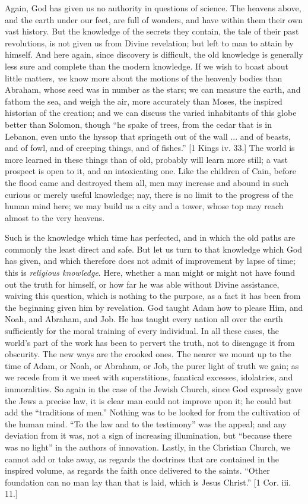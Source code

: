 Again, God has given us no authority in questions of science. The
heavens above, and the earth under our feet, are full of wonders, and
have within them their own vast history. But the knowledge of the
secrets they contain, the tale of their past revolutions, is not given
us from Divine revelation; but left to man to attain by himself. And
here again, since discovery is difficult, the old knowledge is
generally less sure and complete than the modern knowledge. If we wish
to boast about little matters, \emph{we} know more about the motions
of the heavenly bodies than Abraham, whose seed was in number as the
stars; we can measure the earth, and fathom the sea, and weigh the
air, more accurately than Moses, the inspired historian of the
creation; and we can discuss the varied inhabitants of this globe
better than Solomon, though ``he spake of trees, from the cedar
that is in Lebanon, even unto the hyssop that springeth out of the
wall ... and of beasts, and of fowl, and of creeping things, and of
fishes.'' [1 Kings iv. 33.] The world is more learned in these
things than of old, probably will learn more still; a vast prospect is
open to it, and an intoxicating one. Like the children of Cain, before
the flood came and destroyed them all, men may increase and abound in
such curious or merely useful knowledge; nay, there is no limit to the
progress of the human mind here; we may build us a city and a tower,
whose top may reach almost to the very heavens.

Such is the knowledge which time has perfected, and in which the
old paths are commonly the least direct and safe. But let us turn to
that knowledge which God has given, and which therefore does not admit
of improvement by lapse of time; this is \emph{religious knowledge}.
Here, whether a man might or might not have found out the truth for
himself, or how far he was able without Divine assistance, waiving
this question, which is nothing to the purpose, as a fact it has been
from the beginning given him by revelation. God taught Adam how to
please Him, and Noah, and Abraham, and Job. He has taught every nation
all over the earth sufficiently for the moral training of every
individual. In all these cases, the world's part of the work has been
to pervert the truth, not to disengage it from obscurity. The new ways
are the crooked ones. The nearer we mount up to the time of Adam, or
Noah, or Abraham, or Job, the purer light of truth we gain; as we
recede from it we meet with superstitions, fanatical excesses,
idolatries, and immoralities. So again in the case of the Jewish
Church, since God expressly gave the Jews a precise law, it is clear
man could not improve upon it; he could but add the ``traditions
of men.'' Nothing was to be looked for from the cultivation of the
human mind. ``To the law and to the testimony'' was the
appeal; and any deviation from it was, not a sign of increasing
illumination, but ``because there was no light'' in the
authors of innovation. Lastly, in the Christian Church, we cannot add
or take away, as regards the doctrines that are contained in the
inspired volume, as regards the faith once delivered to the saints.
``Other foundation can no man lay than that is laid, which is
Jesus Christ.'' [1 Cor. iii. 11.]

